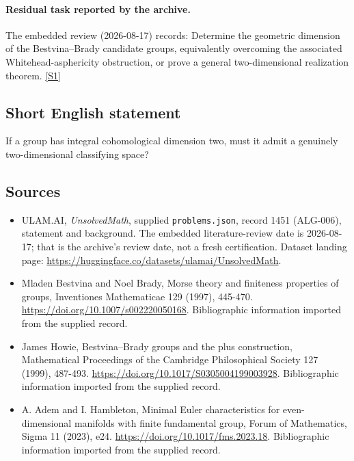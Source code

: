 \documentclass[11pt,a4paper]{article}
\newcommand{\sref}[2]{\hyperlink{source:#1:#2}{[S#2]}}
\begin{document}
\paragraph{Residual task reported by the archive.}

The embedded review (2026-08-17) records: Determine the geometric dimension of the Bestvina--Brady candidate groups, equivalently overcoming the associated Whitehead-asphericity obstruction, or prove a general two-dimensional realization theorem. \sref{1451}{1}

\subsection{Short English statement}

If a group has integral cohomological dimension two, must it admit a genuinely two-dimensional classifying space?

\subsection{Sources}

{\small

\begin{itemize}

\item[\hypertarget{source:1451:1}{S1}] ULAM.AI, \emph{UnsolvedMath}, supplied \texttt{problems.json}, record 1451 (ALG-006), statement and background. The embedded literature-review date is 2026-08-17; that is the archive’s review date, not a fresh certification. Dataset landing page: \url{https://huggingface.co/datasets/ulamai/UnsolvedMath}.

\item[\hypertarget{source:1451:2}{S2}] Mladen Bestvina and Noel Brady, Morse theory and finiteness properties of groups, Inventiones Mathematicae 129 (1997), 445-470. \url{https://doi.org/10.1007/s002220050168}. Bibliographic information imported from the supplied record.

\item[\hypertarget{source:1451:3}{S3}] James Howie, Bestvina--Brady groups and the plus construction, Mathematical Proceedings of the Cambridge Philosophical Society 127 (1999), 487-493. \url{https://doi.org/10.1017/S0305004199003928}. Bibliographic information imported from the supplied record.

\item[\hypertarget{source:1451:4}{S4}] A. Adem and I. Hambleton, Minimal Euler characteristics for even-dimensional manifolds with finite fundamental group, Forum of Mathematics, Sigma 11 (2023), e24. \url{https://doi.org/10.1017/fms.2023.18}. Bibliographic information imported from the supplied record.

\end{itemize}

}

\label{end:1451}
\end{document}

